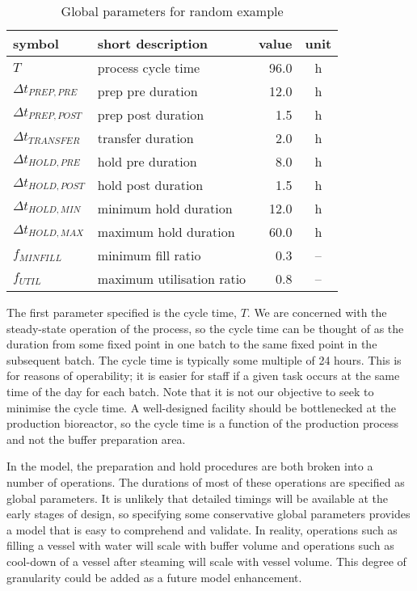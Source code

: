 \begin{table}[h!]
    \centering
    \caption{Global parameters for random example}
    \label{tbl.parameters}
    \begin{tabular}{l | l | r | c}
        symbol & short description & value & unit\\ \hline
        $T$ & process cycle time & 96.0 & h\\
        $\Delta t_{\mathit{PREP,PRE}}$ & prep pre duration & 12.0 & h\\
        $\Delta t_{\mathit{PREP,POST}}$ & prep post duration & 1.5 & h\\
        $\Delta t_{\mathit{TRANSFER}}$ & transfer duration & 2.0 & h\\
        $\Delta t_{\mathit{HOLD,PRE}}$ & hold pre duration & 8.0 & h\\
        $\Delta t_{\mathit{HOLD,POST}}$ & hold post duration & 1.5 & h\\
        $\Delta t_{\mathit{HOLD,MIN}}$ & minimum hold duration & 12.0 & h\\
        $\Delta t_{\mathit{HOLD,MAX}}$ & maximum hold duration & 60.0 & h\\
        $f_{\mathit{MINFILL}}$ & minimum fill ratio & 0.3 & --\\
        $f_{\mathit{UTIL}}$ & maximum utilisation ratio & 0.8 & --\\
    \end{tabular}
\end{table}

The first parameter specified is the cycle time, $T$.  We are concerned
with the steady-state operation of the process, so the cycle time can be
thought of as the duration from some fixed point in one batch to the same
fixed point in the subsequent batch.
The cycle time is typically some multiple of 24 hours.
This is for reasons of operability; it is easier for staff if a given task
occurs at the same time of the day for each batch.
Note that it is not our objective to seek to minimise the cycle time.
A well-designed facility should be bottlenecked at the production bioreactor,
so the cycle time is a function of the production process and not the buffer
preparation area.

In the model, the preparation and hold procedures are both broken into a number
of operations.
The durations of most of these operations are specified as global parameters.
It is unlikely that detailed timings will be available at the early stages of
design, so specifying some conservative global parameters provides a model that
is easy to comprehend and validate.
In reality, operations such as filling a vessel with water will scale with
buffer volume and operations such as cool-down of a vessel after steaming will
scale with vessel volume.
This degree of granularity could be added as a future model enhancement.

